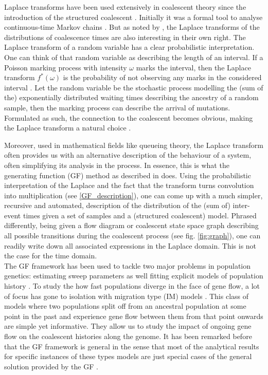 \documentclass[10pt, a4]{article}
\begin{document}
Laplace transforms have been used extensively in coalescent theory since the introduction of the structured coalescent \citep{Takahata1988, Notohara1990, Barton1995}. Initially it was a formal tool to analyse continuous-time Markov chains \citep{Takahata1988, Griffiths1991, Wilkinson-herbots1998}. But as noted by \citet{Wilkinson-herbots1998}, the Laplace transforms of the distributions of coalescence times are also interesting in their own right. The Laplace transform of a random variable has a clear probabilistic interpretation. One can think of that random variable as describing the length of an interval. If a Poisson marking process with intensity $\omega$ marks the interval, then the Laplace transform $f^*(\omega)$ is the probability of not observing any marks in the considered interval \citep{Rade1972}. Let the random variable be the stochastic process modelling the (sum of the) exponentially distributed waiting times describing the ancestry of a random sample, then the marking process can describe the arrival of mutations. Formulated as such, the connection to the coalescent \citep{Kingman1982, Hudson1983, Tajima1983} becomes obvious, making the Laplace transform a natural choice \citep{Weissman2017}.

Moreover, used in mathematical fields like queueing theory, the Laplace transform often provides us with an alternative description of the behaviour of a system, often simplifying its analysis in the process. In essence, this is what the generating function (GF) method as described in \citet{Lohse2011} does. Using the probabilistic interpretation of the Laplace and the fact that the transform turns convolution into multiplication (see \ref{GF_description}), one can come up with a much simpler, recursive and automated, description of the distribution of the (sum of) inter-event times given a set of samples and a (structured coalescent) model. Phrased differently, being given a flow diagram or coalescent state space graph describing all possible transitions during the coalescent process (see fig. \ref{fig:graph}), one can readily write down all associated expressions in the Laplace domain. This is not the case for the time domain.\\

The GF framework has been used to tackle two major problems in population genetics: estimating sweep parameters \citep{Bisschop2021} as well fitting explicit models of population history \citep{Lohse2011, Bunnefeld2015, Lohse2016}. To study the how fast populations diverge in the face of gene flow, a lot of focus has gone to isolation with migration type (IM) models \citep{Nielsen2001}. This class of models where two populations split off from an ancestral population at some point in the past and experience gene flow between them from that point onwards are simple yet informative. They allow us to study the impact of ongoing gene flow on the coalescent histories along the genome. It has been remarked before that the GF framework is general in the sense that most of the analytical results for specific instances of these types models are just special cases of the general solution provided by the GF \citep{Lohse2016}. %
\end{document}
